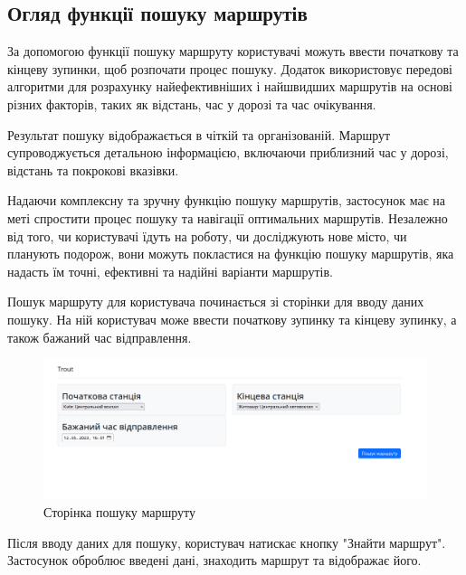 \subsection{Огляд функції пошуку маршрутів}
\label{subsec:route-management-subsection}

За допомогою функції пошуку маршруту користувачі можуть ввести початкову та кінцеву зупинки, щоб розпочати процес пошуку. Додаток використовує передові алгоритми для розрахунку найефективніших і найшвидших маршрутів на основі різних факторів, таких як відстань, час у дорозі та час очікування.

Результат пошуку відображається в чіткій та організованій. Маршрут супроводжується детальною інформацією, включаючи приблизний час у дорозі, відстань та покрокові вказівки.

Надаючи комплексну та зручну функцію пошуку маршрутів, застосунок має на меті спростити процес пошуку та навігації оптимальних маршрутів. Незалежно від того, чи користувачі їдуть на роботу, чи досліджують нове місто, чи планують подорож, вони можуть покластися на функцію пошуку маршрутів, яка надасть їм точні, ефективні та надійні варіанти маршрутів.

Пошук маршруту для користувача починається зі сторінки для вводу даних пошуку. На ній користувач може ввести початкову зупинку та кінцеву зупинку, а також бажаний час відправлення.

\begin{figure}[!htp]
	\centering
	\includegraphics[scale=0.4]{content/chapters/4-results/assets/img/example1_search.png}
	\caption{Сторінка пошуку маршруту}
	\label{fig:search_page}
\end{figure}


Після вводу даних для пошуку, користувач натискає кнопку "Знайти маршрут". Застосунок оброблює введені дані, знаходить маршрут та відображає його.

